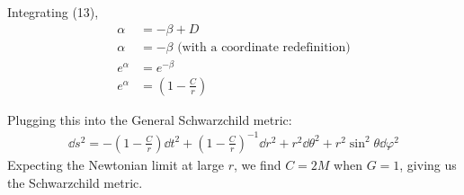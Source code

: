 \documentclass[12pt]{article}
\begin{document}
Integrating (13),
\begin{align}
  \alpha &= -\beta + D \\
  \alpha &= -\beta \text{ (with a coordinate redefinition)} \\
  e^\alpha &= e^{-\beta} \\
  e^\alpha &= \left(1-\frac{C}{r}\right)
\end{align}

Plugging this into the General Schwarzchild metric:
\begin{align}
  \dd{s^2} = -\left(1-\frac{C}{r}\right)\dd{t^2} + \left(1-\frac{C}{r}\right)^{-1}\dd{r^2} + r^2\dd{\theta^2} + r^2\sin^2{\theta}\dd{\varphi^2}
\end{align}
Expecting the Newtonian limit at large $r$, we find $C = 2M$ when $G=1$, giving us the Schwarzchild metric.
\end{document}
